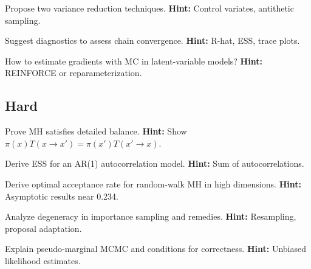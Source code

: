 \begin{problem}
Propose two variance reduction techniques.
\textbf{Hint:} Control variates, antithetic sampling.
\end{problem}

\begin{problem}[Convergence]
Suggest diagnostics to assess chain convergence.
\textbf{Hint:} R-hat, ESS, trace plots.
\end{problem}

\begin{problem}
How to estimate gradients with MC in latent-variable models?
\textbf{Hint:} REINFORCE or reparameterization.
\end{problem}

\subsection*{Hard}
\begin{problem}
Prove MH satisfies detailed balance.
\textbf{Hint:} Show $\pi(x)T(x\to x')=\pi(x')T(x'\to x)$.
\end{problem}

\begin{problem}
Derive ESS for an AR(1) autocorrelation model.
\textbf{Hint:} Sum of autocorrelations.
\end{problem}

\begin{problem}
Derive optimal acceptance rate for random-walk MH in high dimensions.
\textbf{Hint:} Asymptotic results near 0.234.
\end{problem}

\begin{problem}
Analyze degeneracy in importance sampling and remedies.
\textbf{Hint:} Resampling, proposal adaptation.
\end{problem}

\begin{problem}
Explain pseudo-marginal MCMC and conditions for correctness.
\textbf{Hint:} Unbiased likelihood estimates.
\end{problem}


